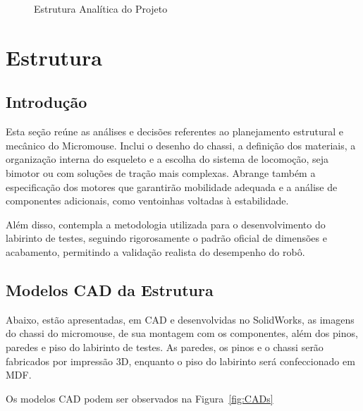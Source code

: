 \begin{landscape}
    \begin{figure}[htbp]
        \centering
        
        \caption{Estrutura Analítica do Projeto}
        \label{fig:eap}
    \end{figure}
\end{landscape}

\section{Estrutura}

\subsection{Introdução}
Esta seção reúne as análises e decisões referentes ao planejamento estrutural e mecânico do Micromouse. Inclui o desenho do chassi, a definição dos materiais, a organização interna do esqueleto e a escolha do sistema de locomoção, seja bimotor ou com soluções de tração mais complexas. Abrange também a especificação dos motores que garantirão mobilidade adequada e a análise de componentes adicionais, como ventoinhas voltadas à estabilidade.

Além disso, contempla a metodologia utilizada para o desenvolvimento do labirinto de testes, seguindo rigorosamente o padrão oficial de dimensões e acabamento, permitindo a validação realista do desempenho do robô.

\subsection{Modelos CAD da Estrutura}
Abaixo, estão apresentadas, em CAD e desenvolvidas no SolidWorks, as imagens do chassi do micromouse, de sua montagem com os componentes, além dos pinos, paredes e piso do labirinto de testes. As paredes, os pinos e o chassi serão fabricados por impressão 3D, enquanto o piso do labirinto será confeccionado em MDF.

Os modelos CAD podem ser observados na Figura~\ref{fig:CADs}

